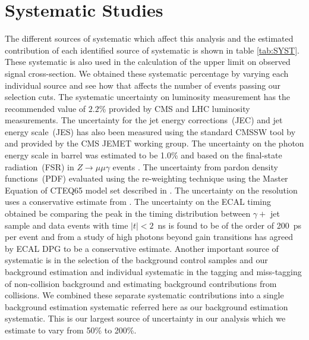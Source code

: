 \section{Systematic Studies}
The different sources of systematic which affect this analysis and the estimated contribution of each identified source of systematic is shown in table \ref{tab:SYST}.
These systematic is also used in the calculation of the upper limit on observed signal cross-section. We obtained these systematic percentage by varying each individual source and see how that affects the number of events passing our selection cuts.
The systematic uncertainty on luminosity measurement has the recommended value of $2.2$\% provided by CMS and LHC luminosity measurements. The uncertainty for the jet energy corrections~(JEC) and jet energy scale~(JES) has also been measured using the standard CMSSW tool by \cite{JES} and provided by the CMS JEMET working group. The uncertainty on the photon energy scale in barrel was estimated to be 1.0\% and based on the final-state radiation~(FSR) in $Z\rightarrow \mu\mu\gamma$ events \cite{PES}. The uncertainty from pardon density functions~(PDF) evaluated using the re-weighting technique using the Master Equation of CTEQ65 model set described in \cite{PDF}. The uncertainty on the \MET resolution uses a conservative estimate from \cite{METRES}. The uncertainty on the ECAL timing obtained be comparing the peak in the timing distribution between $\gamma +$ jet sample and data events with time $|t| < 2$~ns is found to be of the order of 200~ps per event and from a study of high \pt photons beyond gain transitions has agreed by ECAL DPG to be a conservative estimate. Another important source of systematic is in the selection of the background control samples and our background estimation and individual systematic in the tagging and miss-tagging of non-collision background and estimating background contributions from collisions. We combined these separate systematic contributions into a single background estimation systematic referred here as our background estimation systematic. This is our largest source of uncertainty in our analysis which we estimate to vary from 50\% to 200\%. 



